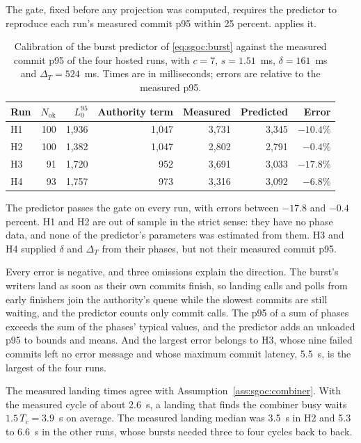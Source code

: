 \documentclass[11pt,letterpaper]{article}
\theoremstyle{definition}
\theoremstyle{remark}
\begin{document}
The gate, fixed before any projection was computed, requires the predictor to reproduce each run's measured commit p95 within 25 percent.  applies it.

\begin{table}[t]
\centering
\caption{Calibration of the burst predictor of \cref{eq:sgoc:burst} against the measured commit p95 of the four hosted runs, with $c = 7$, $s = 1.51$~ms, $\delta = 161$~ms and $\Delta_T = 524$~ms. Times are in milliseconds; errors are relative to the measured p95.}
\label{tab:sgoc:calibration}
\small
\begin{tabular}{@{}lrrrrrr@{}}
\toprule
Run & $N_{\mathrm{ok}}$ & $L_0^{95}$ & Authority term & Measured & Predicted & Error \\
\midrule
H1 & 100 & 1,936 & 1,047 & 3,731 & 3,345 & $-10.4\%$ \\ %
H2 & 100 & 1,382 & 1,047 & 2,802 & 2,791 & $-0.4\%$ \\ %
H3 & 91 & 1,720 & 952 & 3,691 & 3,033 & $-17.8\%$ \\ %
H4 & 93 & 1,757 & 973 & 3,316 & 3,092 & $-6.8\%$ \\ %
\bottomrule
\end{tabular}
\end{table}

The predictor passes the gate on every run, with errors between $-17.8$ and $-0.4$ percent. H1 and H2 are out of sample in the strict sense: they have no phase data, and none of the predictor's parameters was estimated from them. H3 and H4 supplied $\delta$ and $\Delta_T$ from their phases, but not their measured commit p95.

Every error is negative, and three omissions explain the direction. The burst's writers land as soon as their own commits finish, so landing calls and polls from early finishers join the authority's queue while the slowest commits are still waiting, and the predictor counts only commit calls. The p95 of a sum of phases exceeds the sum of the phases' typical values, and the predictor adds an unloaded p95 to bounds and means. And the largest error belongs to H3, whose nine failed commits left no error message and whose maximum commit latency, 5.5~s, is the largest of the four runs. %

The measured landing times agree with Assumption~\ref{ass:sgoc:combiner}. With the measured cycle of about 2.6~s, a landing that finds the combiner busy waits $1.5\,T_c = 3.9$~s on average. The measured landing median was 3.5~s in H2 and 5.3 to 6.6~s in the other runs, whose bursts needed three to four cycles back to back. %
\end{document}
